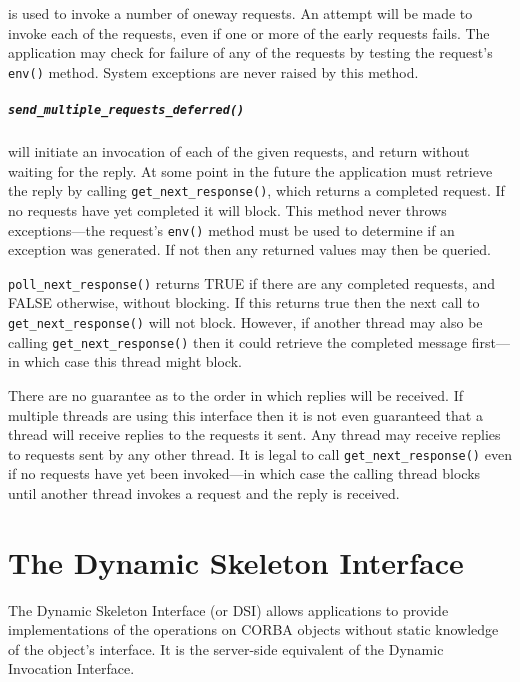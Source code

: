 \documentclass[11pt,twoside,a4paper]{book}
\newcommand{\op}[1]{\texttt{#1()}}
\begin{document}
is used to invoke a number of oneway requests. An attempt will be made
to invoke each of the requests, even if one or more of the early
requests fails.  The application may check for failure of any of the
requests by testing the request's \op{env} method. System exceptions
are never raised by this method.

\paragraph{\op{send\_multiple\_requests\_deferred}}

will initiate an invocation of each of the given requests, and return
without waiting for the reply.  At some point in the future the
application must retrieve the reply by calling
\op{get\_next\_response}, which returns a completed request.  If no
requests have yet completed it will block.  This method never throws
exceptions---the request's \op{env} method must be used to determine
if an exception was generated. If not then any returned values may
then be queried.

\op{poll\_next\_response} returns TRUE if there are any completed
requests, and FALSE otherwise, without blocking. If this returns true
then the next call to \op{get\_next\_response} will not block.
However, if another thread may also be calling
\op{get\_next\_response} then it could retrieve the completed message
first---in which case this thread might block.

There are no guarantee as to the order in which replies will be
received.  If multiple threads are using this interface then it is not
even guaranteed that a thread will receive replies to the requests it
sent. Any thread may receive replies to requests sent by any other
thread. It is legal to call \op{get\_next\_response} even if no
requests have yet been invoked---in which case the calling thread
blocks until another thread invokes a request and the reply is
received.


\chapter{The Dynamic Skeleton Interface}
\label{chap:dsi}

The Dynamic Skeleton Interface (or DSI) allows applications to provide
implementations of the operations on CORBA objects without static
knowledge of the object's interface. It is the server-side equivalent
of the Dynamic Invocation Interface.
\end{document}
